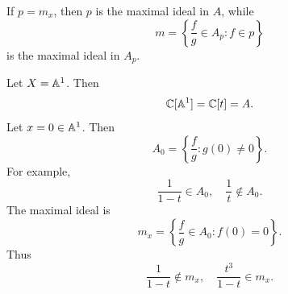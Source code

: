 \begin{remark}
    If $p = m_x$, then $p$ is the maximal ideal in $A$, while
    \[
        m = \left\{\frac{f}{g}\in A_p : f\in p\right\}
    \]
    is the maximal ideal in $A_p$.
\end{remark}

\begin{example}
    Let $X = \aa^1$.
    Then
    \[
        \c[\aa^1] = \c[t] = A.
    \]
    Let $x = 0\in \aa^1$.
    Then
    \[
        A_0 = \left\{\frac{f}{g} : g(0)\neq 0\right\}.
    \]
    For example,
    \[
        \frac{1}{1 - t}\in A_0,\quad \frac{1}{t}\notin A_0.
    \]
    The maximal ideal is
    \[
        m_x = \left\{\frac{f}{g}\in A_0 : f(0) = 0\right\}.
    \]
    Thus
    \[
        \frac{1}{1 - t}\notin m_x,\quad \frac{t^3}{1 - t}\in m_x.
    \]
\end{example}